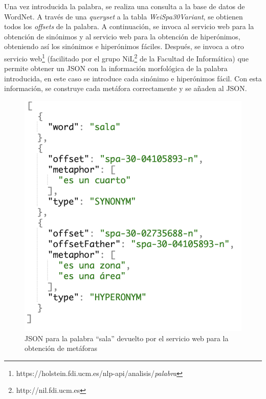Una vez introducida la palabra, se realiza una consulta a la base de datos de WordNet. A través de una \textit{queryset} a la tabla \textit{WeiSpa30Variant}, se obtienen todos los \textit{offsets} de la palabra.
A continuación, se invoca al servicio web para la obtención de sinónimos y al servicio web para la obtención de hiperónimos, obteniendo así los sinónimos e hiperónimos fáciles. Después, se invoca a otro servicio web\footnote{https://holstein.fdi.ucm.es/nlp-api/analisis/\textit{palabra}} (facilitado por el grupo NiL\footnote{http://nil.fdi.ucm.es}  de la Facultad de Informática) que permite obtener un JSON con la información morfológica de la palabra introducida, en este caso se introduce cada sinónimo e hiperónimos fácil.
Con esta información, se construye cada metáfora correctamente y se añaden al JSON.

\begin{figure}[!h]
	\includegraphics[width=.6\textwidth]{Imagenes/Bitmap/Capitulo4/JSON-SW/peticionMetaphor.png}
	\centering
	\caption{JSON para la palabra ``sala'' devuelto por el servicio web para la obtención de metáforas}
	\label{fig:peticionMetaphor}
\end{figure}


